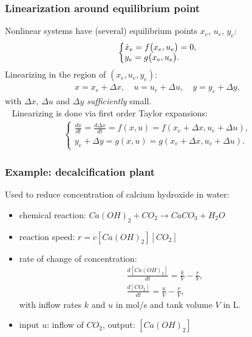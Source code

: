 \documentclass{beamer}
\begin{document}
\begin{frame}
\frametitle{Linearization around equilibrium point}
\pause
Nonlinear systems have (several) equilibrium points $x_e$, $u_e$, $y_e$:
\begin{align*}
\left\{ \begin{matrix}
\dot{x}_e = f\big(x_e, u_e\big)=0, \hfill \\
y_e = g\big(x_e, u_e\big). \hfill
\end{matrix}\right.
\end{align*}
\pause
Linearizing in the region of $(x_e, u_e, y_e)$:
\begin{align*}
x = x_e + \Delta x, \quad u = u_e + \Delta u, \quad y = y_e + \Delta y,
\end{align*}
\pause
with $\Delta x$, $\Delta u$ and $\Delta y$ \emph{sufficiently} small.\\
\ \newline
\pause
Linearizing is done via first order Taylor expansions:
\begin{align*}
\left\{ \begin{matrix}
\frac{dx}{dt} = \frac{d\Delta x}{dt} = f(x,u) = f(x_e+\Delta x, u_e + \Delta u), \\
y_e + \Delta y = g(x, u) = g(x_e + \Delta x, u_e + \Delta u).
\end{matrix}\right.
\end{align*}
\end{frame}

\begin{frame}
\frametitle{Example: decalcification plant}
Used to reduce concentration of calcium hydroxide in water:
\begin{itemize}
\item chemical reaction: $Ca(OH)_2 + CO_2 \rightarrow CaCO_3 + H_2O$
\item reaction speed: $r = c[Ca(OH)_2][CO_2]$
\item rate of change of concentration:
\begin{align*}
\frac{d[Ca(OH)_2]}{dt} = \frac{k}{V} - \frac{r}{V}, \\
\frac{d[CO_2]}{dt} = \frac{u}{V} - \frac{r}{V}, 
\end{align*}
with inflow rates $k$ and $u$ in mol/s and tank volume $V$ in L.
\item input $u$: inflow of $CO_2$, output: $[Ca(OH)_2]$
\end{itemize}
\end{frame}
\end{document}
